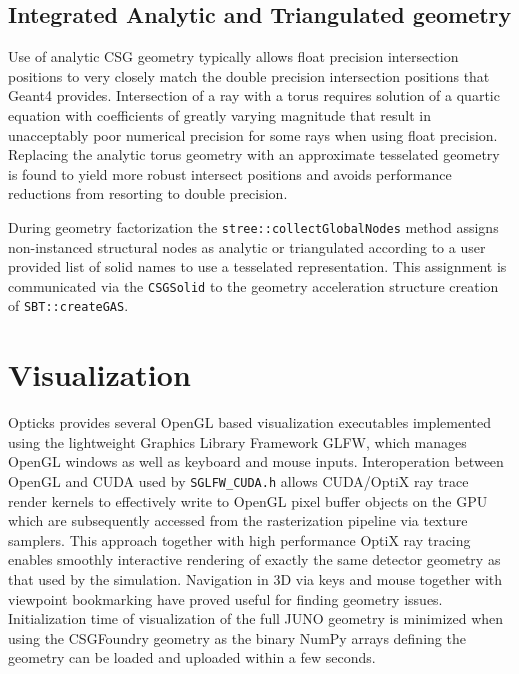 \documentclass{webofc}
\begin{document}
\subsection{Integrated Analytic and Triangulated geometry}
Use of analytic CSG geometry typically allows float precision intersection 
positions to very closely match the double precision intersection positions 
that Geant4 provides. 
Intersection of a ray with a torus requires solution of a quartic equation
with coefficients of greatly varying magnitude that result in unacceptably 
poor numerical precision for some rays when using float precision. 
Replacing the analytic torus geometry with an approximate
tesselated geometry is found to yield more robust intersect positions
and avoids performance reductions from resorting to double precision.  

During geometry factorization the {\tt stree::collectGlobalNodes} method
assigns non-instanced structural nodes as analytic or
triangulated according to a user provided list of solid names to use 
a tesselated representation. This assignment is communicated via the {\tt CSGSolid}     
to the geometry acceleration structure creation of {\tt SBT::createGAS}. 
%
%
%
%
\section{Visualization}%
%
Opticks provides several OpenGL based visualization executables 
implemented using the lightweight Graphics Library Framework GLFW,
which manages OpenGL windows as well as keyboard and mouse inputs. 
Interoperation between OpenGL and CUDA used by {\tt SGLFW\_CUDA.h}
allows CUDA/OptiX ray trace render kernels to effectively write to OpenGL 
pixel buffer objects on the GPU which are subsequently accessed from the 
rasterization pipeline via texture samplers. This approach together with
high performance OptiX ray tracing enables smoothly interactive rendering of 
exactly the same detector geometry as that used by the simulation. 
Navigation in 3D via keys and mouse together 
with viewpoint bookmarking have proved useful for finding geometry issues.      
Initialization time of visualization of the full JUNO geometry 
is minimized when using the CSGFoundry geometry as the binary NumPy arrays defining 
the geometry can be loaded and uploaded within a few seconds.  
\end{document}
